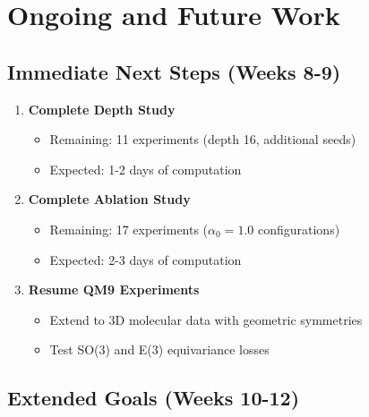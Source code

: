\documentclass[11pt,a4paper]{article}
\begin{document}
\section{Ongoing and Future Work}

\subsection{Immediate Next Steps (Weeks 8-9)}

\begin{enumerate}
    \item \textbf{Complete Depth Study}
    \begin{itemize}
        \item Remaining: 11 experiments (depth 16, additional seeds)
        \item Expected: 1-2 days of computation
    \end{itemize}
    
    \item \textbf{Complete Ablation Study}
    \begin{itemize}
        \item Remaining: 17 experiments ($\alpha_0 = 1.0$ configurations)
        \item Expected: 2-3 days of computation
    \end{itemize}
    
    \item \textbf{Resume QM9 Experiments}
    \begin{itemize}
        \item Extend to 3D molecular data with geometric symmetries
        \item Test SO(3) and E(3) equivariance losses
    \end{itemize}
\end{enumerate}

\subsection{Extended Goals (Weeks 10-12)}
\end{document}
